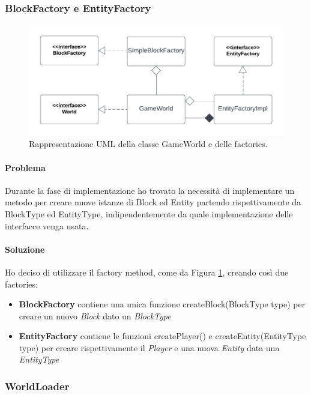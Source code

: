 \documentclass[a4paper,12pt]{report}
\begin{document}
    \subsubsection{BlockFactory e EntityFactory}

    \begin{figure}[H]
        \centering{}
        \includegraphics[scale=1] {img/world.png}
        \caption{Rappresentazione UML della classe GameWorld e delle factories.}
        \label{img:world}
    \end{figure}

    \paragraph{Problema} Durante la fase di implementazione ho trovato la necessità di implementare un metodo per creare nuove istanze di Block ed Entity partendo rispettivamente da BlockType ed EntityType, indipendentemente da quale implementazione delle interfacce venga usata.

    \paragraph{Soluzione} Ho deciso di utilizzare il factory method, come da Figura  \ref{img:world}, creando così due factories:
    \begin{itemize}
        \item \textbf{BlockFactory} contiene una unica funzione createBlock(BlockType type) per creare un nuovo \emph{Block} dato un \emph{BlockType}
        \item \textbf{EntityFactory} contiene le funzioni createPlayer() e createEntity(EntityType type) per creare rispettivamente il \emph{Player} e una nuova \emph{Entity} data una \emph{EntityType}
    \end{itemize}

    \subsubsection{WorldLoader}
\end{document}

